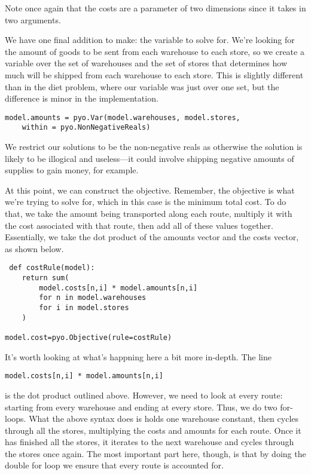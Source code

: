 \documentclass{article}
\begin{document}
\noindent
Note once again that the costs are a parameter of two dimensions since it takes in two arguments.  

We have one final addition to make: the variable to solve for.  We're looking for the amount of goods to be sent from each warehouse to each store, so we create a variable over the set of warehouses and the set of stores that determines how much will be shipped from each warehouse to each store.  This is slightly different than in the diet problem, where our variable was just over one set, but the difference is minor in the implementation.

\begin{verbatim}
model.amounts = pyo.Var(model.warehouses, model.stores, 
    within = pyo.NonNegativeReals)
\end{verbatim}

\noindent
We restrict our solutions to be the non-negative reals as otherwise the solution is likely to be illogical and useless---it could involve shipping negative amounts of supplies to gain money, for example.

At this point, we can construct the objective.  Remember, the objective is what we're trying to solve for, which in this case is the minimum total cost.  To do that, we take the amount being transported along each route, multiply it with the cost associated with that route, then add all of these values together.  Essentially, we take the dot product of the amounts vector and the costs vector, as shown below.

\begin{verbatim}
 def costRule(model):
    return sum(
        model.costs[n,i] * model.amounts[n,i]
        for n in model.warehouses
        for i in model.stores
    )

model.cost=pyo.Objective(rule=costRule)
\end{verbatim}

\noindent
It's worth looking at what's happning here a bit more in-depth.  The line \begin{verbatim}model.costs[n,i] * model.amounts[n,i] \end{verbatim} is the dot product outlined above.  However, we need to look at every route: starting from every warehouse and ending at every store.  Thus, we do two for-loops.  What the above syntax does is holds one warehouse constant, then cycles through all the stores, multiplying the costs and amounts for each route.  Once it has finished all the stores, it iterates to the next warehouse and cycles through the stores once again.  The most important part here, though, is that by doing the double for loop we ensure that every route is accounted for.
\end{document}
